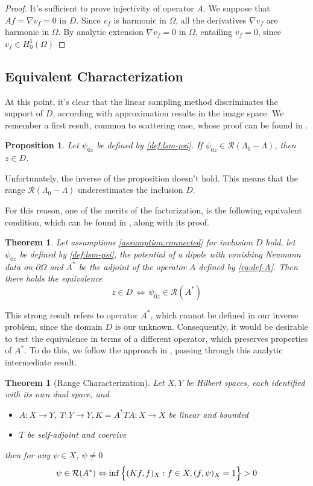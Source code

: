 \documentclass[10pt, a4paper, twoside, openright]{book}
\theoremstyle{definition}
\theoremstyle{plain}
\newtheorem{theorem}[subsection]{Theorem}
\theoremstyle{plain}
\theoremstyle{plain}
\newtheorem{proposition}[subsection]{Proposition}
\theoremstyle{plain}
\theoremstyle{plain}
\theoremstyle{plain}
\theoremstyle{plain}
\theoremstyle{plain}
\begin{document}
\begin{proof}
It's sufficient to prove injectivity of operator $A$. We suppose that $Af=\nabla v_f = 0$ in $D$.
Since $v_f$ is harmonic in $\Omega$, all the derivatives $\nabla v_f$ are harmonic in $\Omega$.
By analytic extension $\nabla v_f = 0$ in $\Omega$, entailing $v_f=0$, since $v_f\in H^1_0(\Omega)$
\end{proof}

\subsection{Equivalent Characterization}
At this point, it's clear that the linear sampling method discriminates the support of $D$, according with approximation results in the image space. We remember a first result, common to scattering case, whose proof can be found in \cite{somersalo:preprint}.
\begin{proposition}
 Let $\psi_{0z}$ be defined by \ref{def:lsm-psi}. If $\psi_{0z}\in\mathcal{R}(\Lambda_0-\Lambda)$, then $z\in D$.
\end{proposition}
Unfortunately, the inverse of the proposition doesn't hold. This means that the range $\mathcal{R}(\Lambda_0 - \Lambda)$ underestimates the inclusion $D$.
\par
For this reason, one of the merits of the factorization, is the following equivalent condition, which can be found in \cite{kirsch:book}, along with its proof.
\begin{theorem}
\label{theo:equivalence}
 Let assumptions \ref{assumption:connected} for inclusion $D$ hold, let $\psi_{0z}$ be defined by \ref{def:lsm-psi}, the potential of a dipole with vanishing Neumann data on $\partial \Omega$ and $A^*$ be the adjoint of the operator $A$ defined by \ref{eq:def-A}.
 Then there holds the equivalence 
 \begin{equation}
  z \in D \,\Longleftrightarrow \,\psi_{0z} \in \mathcal{R}(A^*)
 \end{equation}
\end{theorem}
This strong result refers to operator $A^*$, which cannot be defined in our inverse problem, since the domain $D$ is our unknown. Consequently, it would be desirable to test the equivalence in terms of a different operator, which preserves properties of $A^*$. To do this, we follow the approach in \cite{kirsch:book}, passing through this analytic intermediate result.
\begin{theorem}[Range Characterization]
\label{theo:range-characterization}
 Let $X,Y$ be Hilbert spaces, each identified with its own dual space, and 
 \begin{itemize}
  \item $A:X\to Y$, $T:Y\to Y, K=A^*TA:X\to X$ be linear and bounded
  \item $T$ be self-adjoint and coercive
 \end{itemize}
 then for any $\psi \in X$, $\psi\neq 0$
 \begin{equation}
 \psi \in \mathcal{R}(A^*) \Leftrightarrow \inf\Big\{(Kf,f)_X   : f\in X, (f,\psi)_X=1\Big\}>0\\
 \end{equation}
\end{theorem}
\end{document}
